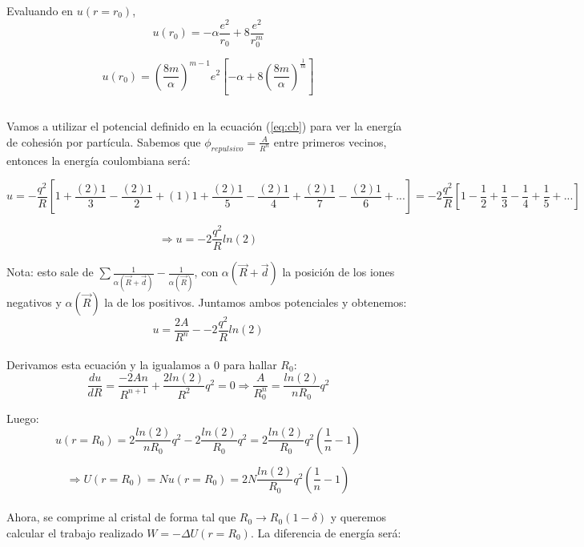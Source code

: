 \documentclass[a4paper]{article}
\begin{document}
Evaluando en $u(r = r_{0})$,\\

$$u(r_{0}) = -\alpha \frac{e^{2}}{r_{0}} + 8\frac{e^{2}}{r_{0}^{m}}$$

$$u(r_{0}) = \left(\frac{8m}{\alpha}\right)^{m-1}e^{2}\left[ -\alpha + 8\left(\frac{8m}{\alpha}\right)^{\frac{1}{m}}\right] $$

\subsection{}

Vamos a utilizar el potencial definido en la ecuaci\'on (\ref{eq:cb}) para ver la energ\'ia de cohesi\'on por part\'icula. Sabemos que $\phi_{repulsivo} = \frac{A}{R^{n}}$ entre primeros vecinos, entonces la energ\'ia coulombiana ser\'a:

$$  u = -\frac{q^{2}}{R}\left[ 1 + \frac{(2)1}{3} - \frac{(2)1}{2} + (1)1 + \frac{(2)1}{5} - \frac{(2)1}{4} + \frac{(2)1}{7} - \frac{(2)1}{6} + ...\right] = -2\frac{q^{2}}{R} \left[ 1 - \frac{1}{2} + \frac{1}{3} - \frac{1}{4} + \frac{1}{5} + ...\right]$$

$$ \Rightarrow u = -2\frac{q^{2}}{R}ln(2)$$

Nota: esto sale de $\sum \frac{1}{\alpha(\vec{R} + \vec{d})} - \frac{1}{\alpha(\vec{R})}$, con $\alpha(\vec{R} + \vec{d})$ la posici\'on de los iones negativos y $\alpha(\vec{R})$ la de los positivos. Juntamos ambos potenciales y obtenemos:\\

$$ u = \frac{2A}{R^{n}} - -2\frac{q^{2}}{R}ln(2)$$\\

Derivamos esta ecuaci\'on y la igualamos a 0 para hallar $R_{0}$:\\

$$ \frac{du}{dR} = \frac{-2An}{R^{n + 1}} + \frac{2ln(2)}{R^{2}}q^{2} = 0 \Rightarrow \frac{A}{R_{0}^{n}} = \frac{ln(2)}{nR_{0}}q^{2}$$ 

Luego:\\

$$ u(r = R_{0}) = 2\frac{ln(2)}{nR_{0}}q^{2} - 2\frac{ln(2)}{R_{0}}q^{2} = 2\frac{ln(2)}{R_{0}}q^{2}\left(\frac{1}{n} - 1 \right)$$

$$ \Rightarrow U(r = R_{0}) = Nu(r = R_{0}) = 2N\frac{ln(2)}{R_{0}}q^{2}\left(\frac{1}{n} - 1 \right)$$\\

Ahora, se comprime al cristal de forma tal que $R_{0} \rightarrow R_{0}(1 - \delta)$ y queremos calcular el trabajo realizado $W = -\Delta U(r = R_{0})$. La diferencia de energ\'ia ser\'a:
\end{document}
